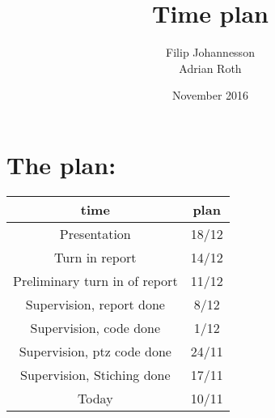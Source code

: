 \documentclass{article}
\title{Time plan}
\author{Filip Johannesson\\ Adrian Roth}
\date{November 2016}
\begin{document}
\maketitle

\section*{The plan:}

\begin{center}
  \begin{tabular}{c||c}
  time &  plan\\ \hline
  Presentation & 18/12 \\
  Turn in report & 14/12 \\
  Preliminary turn in of report & 11/12 \\
  Supervision, report done & 8/12 \\
  Supervision, code done & 1/12 \\
  Supervision, ptz code done & 24/11 \\
  Supervision, Stiching done & 17/11 \\
  Today & 10/11
  \end{tabular}
\end{center}
\end{document}
